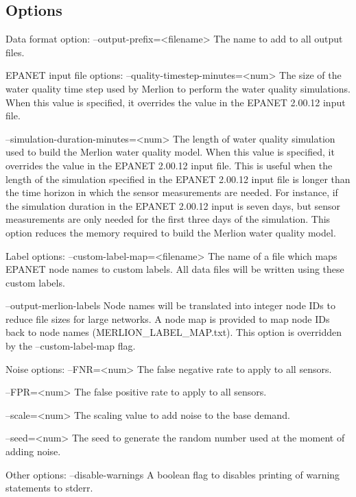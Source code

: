 \subsection{Options}\label{measuregenOptions}
\begin{unknownListing}
Data format option:
     --output-prefix=<filename>         
     The name to add to all output files.
 
EPANET input file options:
     --quality-timestep-minutes=<num>
     The size of the water quality time step used by Merlion to perform the water quality simulations. 
     When this value is specified, it overrides the value in the EPANET 2.00.12 input file.
     
     --simulation-duration-minutes=<num>
     The length of water quality simulation used to build the Merlion water quality model. 
     When this value is specified, it overrides the value in the EPANET 2.00.12 input file. This is useful 
     when the length of the simulation specified in the EPANET 2.00.12 input file is longer than the time 
     horizon in which the sensor measurements are needed. For instance, if the simulation duration 
     in the EPANET 2.00.12 input is seven days, but sensor measurements are only needed for the first three 
     days of the simulation. This option reduces the memory required to build the Merlion water 
     quality model.
 
Label options:
     --custom-label-map=<filename>      
     The name of a file which maps EPANET node names to custom labels. All data files will be written 
     using these custom labels.
     
     --output-merlion-labels 
     Node names will be translated into integer node IDs to reduce file sizes for large networks. 
     A node map is provided to map node IDs back to node names (MERLION_LABEL_MAP.txt). This option
     is overridden by the --custom-label-map flag.
 
Noise options:
     --FNR=<num>                   
     The false negative rate to apply to all sensors.
     
     --FPR=<num>                    
     The false positive rate to apply to all sensors.
     
     --scale=<num>                  
     The scaling value to add noise to the base demand. 
     
     --seed=<num>                   
     The seed to generate the random number used at the moment of adding noise. 
 
Other options:
     --disable-warnings      
     A boolean flag to disables printing of warning statements to stderr.
     

\end{unknownListing}
